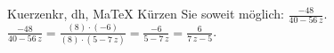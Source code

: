 \begin{MAufgabe}{Kuerzen}{kr, dh, MaTeX}
K\"urzen Sie soweit m\"oglich: $\frac{-48}{40 - 56\, z}$.\\ 
\ifLsg\MLoesung
\quad $\frac{-48}{40 - 56\, z}=\frac{(8)\cdot(-6)}{(8)\cdot(5 - 7\, z)}=\frac{-6}{5 - 7\, z}=\frac{6}{7\, z - 5}$.\else\relax\fi
 \end{MAufgabe}